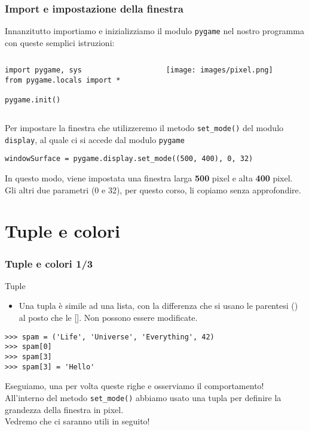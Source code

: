 \documentclass{beamer}
\begin{document}
\begin{frame}[fragile]
\frametitle{Import e impostazione della finestra}
Innanzitutto importiamo e inizializziamo il modulo \texttt{pygame} nel nostro programma con queste semplici istruzioni:
\begin{columns}[T]
	\begin{column}[T]{0.55\textwidth}
		\begin{lstlisting}
import pygame, sys
from pygame.locals import *
		
pygame.init()
		\end{lstlisting}
	\end{column}
	\begin{column}[T]{0.45\textwidth}
		\begin{figure}[t]
			\texttt{[image: images/pixel.png]}
		\end{figure}
	\end{column}
\end{columns}
Per impostare la finestra che utilizzeremo il metodo \texttt{set\_mode()} del modulo \texttt{display}, al quale ci si accede dal modulo \texttt{pygame}
\begin{lstlisting}
windowSurface = pygame.display.set_mode((500, 400), 0, 32)
\end{lstlisting}
In questo modo, viene impostata una finestra larga \textbf{500} pixel e alta \textbf{400} pixel. Gli altri due parametri (0 e 32), per questo corso, li copiamo senza approfondire.
\end{frame}

\section{Tuple e colori}

\begin{frame}[fragile]
\frametitle{Tuple e colori 1/3}
	\begin{block}{Tuple}
		\begin{itemize}
			\item Una tupla è simile ad una lista, con la differenza che si usano le parentesi () al posto che le []. Non possono essere modificate.
		\end{itemize}
	\end{block}
\begin{lstlisting}
>>> spam = ('Life', 'Universe', 'Everything', 42)
>>> spam[0]
>>> spam[3]
>>> spam[3] = 'Hello'
\end{lstlisting}
Eseguiamo, una per volta queste righe e osserviamo il comportamento!\\
All'interno del metodo \texttt{set\_mode()} abbiamo usato una tupla per definire la grandezza della finestra in pixel.\\
Vedremo che ci saranno utili in seguito!
\end{frame}
\end{document}
